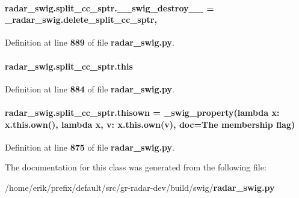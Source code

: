 \paragraph[{\+\_\+\+\_\+swig\+\_\+destroy\+\_\+\+\_\+}]{\setlength{\rightskip}{0pt plus 5cm}radar\+\_\+swig.\+split\+\_\+cc\+\_\+sptr.\+\_\+\+\_\+swig\+\_\+destroy\+\_\+\+\_\+ = \+\_\+radar\+\_\+swig.\+delete\+\_\+split\+\_\+cc\+\_\+sptr\hspace{0.3cm}{\ttfamily [static]}, {\ttfamily [private]}}\label{classradar__swig_1_1split__cc__sptr_ac553426fd48ad8d82363fd6d93f6e8ae}


Definition at line {\bf 889} of file {\bf radar\+\_\+swig.\+py}.

\paragraph[{this}]{\setlength{\rightskip}{0pt plus 5cm}radar\+\_\+swig.\+split\+\_\+cc\+\_\+sptr.\+this}\label{classradar__swig_1_1split__cc__sptr_a38be30264ac6f1f3add99ace8003a765}


Definition at line {\bf 884} of file {\bf radar\+\_\+swig.\+py}.

\paragraph[{thisown}]{\setlength{\rightskip}{0pt plus 5cm}radar\+\_\+swig.\+split\+\_\+cc\+\_\+sptr.\+thisown = {\bf \+\_\+swig\+\_\+property}(lambda x\+: x.\+this.\+own(), lambda {\bf x}, v\+: x.\+this.\+own(v), doc=\textquotesingle{}The membership flag\textquotesingle{})\hspace{0.3cm}{\ttfamily [static]}}\label{classradar__swig_1_1split__cc__sptr_afe4cbd461feced04911e858b3298f90f}


Definition at line {\bf 875} of file {\bf radar\+\_\+swig.\+py}.



The documentation for this class was generated from the following file\+:\begin{DoxyCompactItemize}
\item 
/home/erik/prefix/default/src/gr-\/radar-\/dev/build/swig/{\bf radar\+\_\+swig.\+py}\end{DoxyCompactItemize}
